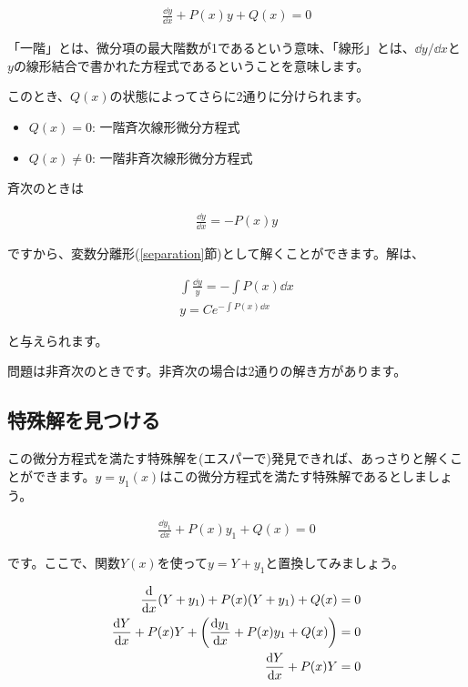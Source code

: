 \begin{eqnarray}
    \frac{\dd y}{\dd x}+P(x)y+Q(x)=0
    \label{eq:first-order}
\end{eqnarray}

「一階」とは、微分項の最大階数が1であるという意味、「線形」とは、$\dd y/\dd x$と$y$の線形結合で書かれた方程式であるということを意味します。

このとき、$Q(x)$の状態によってさらに2通りに分けられます。

\begin{itemize}
    \item $Q(x)=0$: 一階斉次線形微分方程式
    \item $Q(x)\neq0$: 一階非斉次線形微分方程式
\end{itemize}

斉次のときは

\begin{eqnarray}
    \frac{\dd y}{\dd x}=-P(x)y
\end{eqnarray}

\noindent
ですから、変数分離形(\ref{separation}節)として解くことができます。解は、

\begin{eqnarray}
    \int \frac{\dd y}{y}=-\int P(x)\dd x \\
    y=Ce^{-\int P(x)\dd x}
    \label{eq:homogeneous-2}
\end{eqnarray}

\noindent
と与えられます。

問題は非斉次のときです。非斉次の場合は2通りの解き方があります。






\subsection{特殊解を見つける}
\label{special-solution}
この微分方程式を満たす特殊解を(エスパーで)発見できれば、あっさりと解くことができます。$y=y_1(x)$はこの微分方程式を満たす特殊解であるとしましょう。

\begin{eqnarray}
    \frac{\dd y_1}{\dd x}+P(x)y_1+Q(x)=0
    \label{eq:special-y_1}
\end{eqnarray}

\noindent
です。ここで、関数$Y(x)$を使って$y=Y+y_1$と置換してみましょう。

\begin{eqnarray}
    \frac{\dd}{\dd x}(Y+y_1)+P(x)(Y+y_1)+Q(x)=0 \\
    \frac{\dd Y}{\dd x}+P(x)Y+\pqty{\frac{\dd y_1}{\dd x}+P(x)y_1+Q(x)}=0 \nonumber \\
    \frac{\dd Y}{\dd x}+P(x)Y=0
\end{eqnarray}

